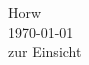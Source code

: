 \begin{titlepage}
\begin{center}


\vfill{}
\vfill{}
\vfill{}

{\large Horw\\ \today\\ zur Einsicht}

\end{center}

\end{titlepage}
